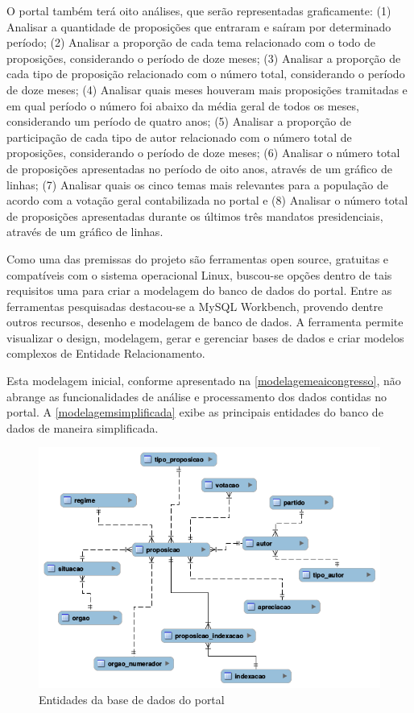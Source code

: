 \documentclass[
	12pt,				%
	openright,			%
	twoside,			%
	a4paper,			%
	english,			%
	french,				%
	spanish,			%
	brazil				%
	]{abntex2}
\begin{document}
O portal também terá oito análises, que serão representadas graficamente: (1) Analisar a quantidade de proposições que entraram e saíram por determinado período; (2) 
Analisar a proporção de cada tema relacionado com o todo de proposições, considerando o período de doze meses; (3) Analisar a proporção de 
cada tipo de proposição relacionado com o número total, considerando o período de doze meses; (4) Analisar quais meses houveram 
mais proposições tramitadas e em qual período o número foi abaixo da média geral de todos os meses, considerando um período de quatro anos; (5)
Analisar a proporção de participação de cada tipo de autor relacionado com o número total de proposições, considerando o período de doze meses; (6)
Analisar o número total de proposições apresentadas no período de oito anos, através de um gráfico de linhas; (7) Analisar quais os cinco temas mais relevantes 
para a população de acordo com a votação geral contabilizada no portal e (8) Analisar o número total de proposições apresentadas durante os últimos três mandatos presidenciais, através de um gráfico de linhas.

Como uma das premissas do projeto são ferramentas open source, gratuitas e compatíveis com o sistema operacional Linux,
buscou-se opções dentro de tais requisitos uma para criar a modelagem do banco de dados do portal. Entre as 
ferramentas pesquisadas destacou-se a MySQL Workbench, provendo dentre outros recursos, desenho e modelagem de banco de dados.
A ferramenta permite visualizar o design, modelagem, gerar e gerenciar bases de dados e criar modelos complexos 
de Entidade Relacionamento.

Esta modelagem inicial, conforme apresentado na \autoref{modelagemeaicongresso}, não abrange as funcionalidades de análise e processamento dos dados contidas no portal. A \autoref{modelagemsimplificada} 
exibe as principais entidades do banco de dados de maneira simplificada.

\begin{figure}[htb]
	\caption{\label{modelagemsimplificada}Entidades da base de dados do portal}
	\begin{center}
	    \includegraphics[scale=0.65]{modeloaicongressosimplificado.png}
	\end{center}
	
\end{figure}
\end{document}
